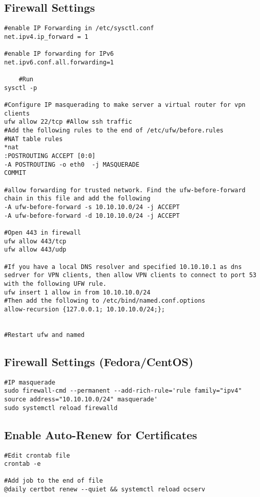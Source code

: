\documentclass{article}
\begin{document}
\subsection{Firewall Settings}
\begin{verbatim}
#enable IP Forwarding in /etc/sysctl.conf 
net.ipv4.ip_forward = 1

#enable IP forwarding for IPv6
net.ipv6.conf.all.forwarding=1
 
	#Run
sysctl -p 

#Configure IP masquerading to make server a virtual router for vpn clients
ufw allow 22/tcp #Allow ssh traffic
#Add the following rules to the end of /etc/ufw/before.rules
#NAT table rules 
*nat 
:POSTROUTING ACCEPT [0:0]
-A POSTROUTING -o eth0	-j MASQUERADE 
COMMIT

#allow forwarding for trusted network. Find the ufw-before-forward chain in this file and add the following 
-A ufw-before-forward -s 10.10.10.0/24 -j ACCEPT
-A ufw-before-forward -d 10.10.10.0/24 -j ACCEPT

#Open 443 in firewall
ufw allow 443/tcp
ufw allow 443/udp

#If you have a local DNS resolver and specified 10.10.10.1 as dns sedrver for VPN clients, then allow VPN clients to connect to port 53 with the following UFW rule. 
ufw insert 1 allow in from 10.10.10.0/24
#Then add the following to /etc/bind/named.conf.options
allow-recursion {127.0.0.1; 10.10.10.0/24;};


#Restart ufw and named

\end{verbatim}

\subsection{Firewall Settings (Fedora/CentOS)}
\begin{lstlisting}
#IP masquerade
sudo firewall-cmd --permanent --add-rich-rule='rule family="ipv4" source address="10.10.10.0/24" masquerade'
sudo systemctl reload firewalld
\end{lstlisting}

\subsection{Enable Auto-Renew for Certificates}
\begin{verbatim}
#Edit crontab file
crontab -e

#Add job to the end of file 
@daily certbot renew --quiet && systemctl reload ocserv

\end{verbatim}
\end{document}
